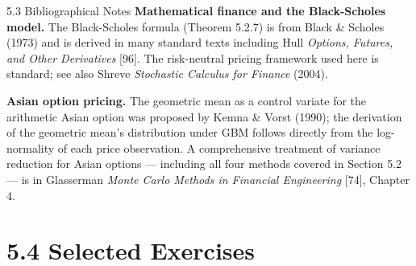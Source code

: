 \documentclass[aspectratio=169,10pt]{beamer}
\begin{document}
\begin{frame}[allowframebreaks]{5.3 Bibliographical Notes}
\textbf{Mathematical finance and the Black-Scholes model.}
The Black-Scholes formula (Theorem 5.2.7) is from Black \& Scholes (1973)
and is derived in many standard texts including Hull \emph{Options, Futures,
and Other Derivatives} [96].  The risk-neutral pricing framework used here
is standard; see also Shreve \emph{Stochastic Calculus for Finance} (2004).

\textbf{Asian option pricing.}
The geometric mean as a control variate for the arithmetic Asian option was
proposed by Kemna \& Vorst (1990); the derivation of the geometric mean's
distribution under GBM follows directly from the log-normality of each price
observation.  A comprehensive treatment of variance reduction for Asian options
--- including all four methods covered in Section 5.2 --- is in Glasserman
\emph{Monte Carlo Methods in Financial Engineering} [74], Chapter 4.

\end{frame}

\section{5.4 Selected Exercises}
\end{document}
